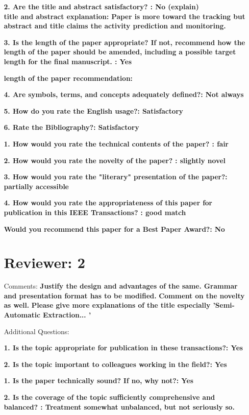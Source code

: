 \documentclass[12pt]{article}
\begin{document}
\textbf{2. Are the title and abstract satisfactory? : No (explain) \\
title and abstract explanation: Paper is more toward the tracking but abstract and title claims the activity prediction and monitoring.}

\textbf{3. Is the length of the paper appropriate? If not, recommend how the length of the paper should be amended, including a possible target length for the final manuscript. : Yes}

\textbf{length of the paper recommendation:}

\textbf{4. Are symbols, terms, and concepts adequately defined?: Not always}

\textbf{5. How do you rate the English usage?: Satisfactory}

\textbf{6. Rate the Bibliography?: Satisfactory}

\textbf{1. How would you rate the technical contents of the paper? : fair}

\textbf{2. How would you rate the novelty of the paper? : slightly novel}

\textbf{3. How would you rate the "literary" presentation of the paper?: partially accessible}

\textbf{4. How would you rate the appropriateness of this paper for publication in this IEEE Transactions? : good match}

\textbf{Would you recommend this paper for a Best Paper Award?: No}


\section*{Reviewer: 2}

Comments:
\textbf{Justify the design and advantages of the same. Grammar and presentation format has to be modified.}
\textbf{Comment on the novelty as well.}
\textbf{Please give more explanations of the title especially 'Semi-Automatic Extraction... '}

Additional Questions:

\textbf{1. Is the topic appropriate for publication in these transactions?: Yes}

\textbf{2. Is the topic important to colleagues working in the field?: Yes}

\textbf{1. Is the paper technically sound? If no, why not?: Yes}


\textbf{2. Is the coverage of the topic sufficiently comprehensive and balanced? : Treatment somewhat unbalanced, but not seriously so.}
\end{document}
